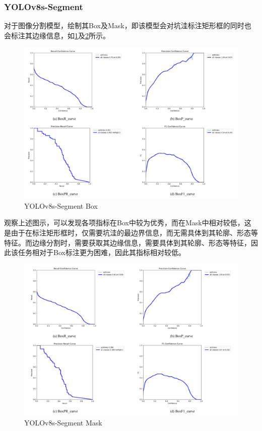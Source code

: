 \documentclass{MathorCupmodeling}
\begin{document}
	\subsubsection{YOLOv8s-Segment}
	对于图像分割模型，绘制其Box及Mask，即该模型会对坑洼标注矩形框的同时也会标注其边缘信息，如\textcolor{blue}{\cref{fig:YOLOv8s-Segment-Box}}及\textcolor{blue}{\cref{fig:YOLOv8s-Segment-Mask}}所示。
	\begin{figure}[H]
		\centering
		\includegraphics[scale=0.48]{Figures/segment/SegmentBox.pdf}
		\caption{YOLOv8s-Segment Box}
		\label{fig:YOLOv8s-Segment-Box}
	\end{figure}
	观察上述图示，可以发现各项指标在Box中较为优秀，而在Mask中相对较低，这是由于在标注矩形框时，仅需要坑洼的最边界信息，而无需具体到其轮廓、形态等特征。而边缘分割时，需要获取其边缘信息，需要具体到其轮廓、形态等特征，因此该任务相对于Box标注更为困难，因此其指标相对较低。

	\begin{figure}[H]
		\centering
		\includegraphics[scale=0.48]{Figures/segment/SegmentMask.pdf}
		\caption{YOLOv8s-Segment Mask}
		\label{fig:YOLOv8s-Segment-Mask}
	\end{figure}
\end{document}
